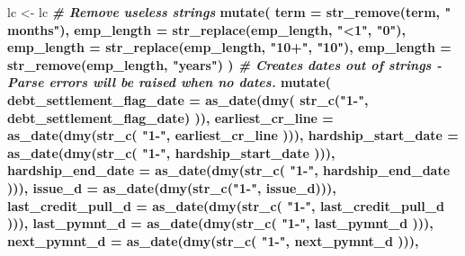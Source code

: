 \documentclass[11pt,]{report}
\newenvironment{Shaded}{\begin{snugshade}}{\end{snugshade}}
\newcommand{\CommentTok}[1]{\textcolor[rgb]{0.56,0.35,0.01}{\textit{#1}}}
\newcommand{\DataTypeTok}[1]{\textcolor[rgb]{0.13,0.29,0.53}{#1}}
\newcommand{\KeywordTok}[1]{\textcolor[rgb]{0.13,0.29,0.53}{\textbf{#1}}}
\newcommand{\NormalTok}[1]{#1}
\newcommand{\OperatorTok}[1]{\textcolor[rgb]{0.81,0.36,0.00}{\textbf{#1}}}
\newcommand{\StringTok}[1]{\textcolor[rgb]{0.31,0.60,0.02}{#1}}
\begin{document}
\begin{Shaded}
\begin{Highlighting}[numbers=left,,]
\NormalTok{  lc <-}\StringTok{ }\NormalTok{lc }\OperatorTok{%
\StringTok{    }\CommentTok{# Remove useless strings}
\StringTok{    }\KeywordTok{mutate}\NormalTok{(}
      \DataTypeTok{term       =} \KeywordTok{str_remove}\NormalTok{(term, }\StringTok{" months"}\NormalTok{),}
      \DataTypeTok{emp_length =} \KeywordTok{str_replace}\NormalTok{(emp_length, }\StringTok{"<1"}\NormalTok{, }\StringTok{"0"}\NormalTok{),}
      \DataTypeTok{emp_length =} \KeywordTok{str_replace}\NormalTok{(emp_length, }\StringTok{"10+"}\NormalTok{, }\StringTok{"10"}\NormalTok{),}
      \DataTypeTok{emp_length =} \KeywordTok{str_remove}\NormalTok{(emp_length, }\StringTok{"years"}\NormalTok{)}
\NormalTok{    ) }\OperatorTok{%
\StringTok{    }
\StringTok{    }\CommentTok{# Creates dates out of strings - Parse errors will be raised when no dates.}
\StringTok{    }\KeywordTok{mutate}\NormalTok{(}
      \DataTypeTok{debt_settlement_flag_date =} \KeywordTok{as_date}\NormalTok{(}\KeywordTok{dmy}\NormalTok{(}
        \KeywordTok{str_c}\NormalTok{(}\StringTok{"1-"}\NormalTok{, debt_settlement_flag_date)}
\NormalTok{      )),}
      \DataTypeTok{earliest_cr_line          =} \KeywordTok{as_date}\NormalTok{(}\KeywordTok{dmy}\NormalTok{(}\KeywordTok{str_c}\NormalTok{(}
        \StringTok{"1-"}\NormalTok{, earliest_cr_line}
\NormalTok{      ))),}
      \DataTypeTok{hardship_start_date       =} \KeywordTok{as_date}\NormalTok{(}\KeywordTok{dmy}\NormalTok{(}\KeywordTok{str_c}\NormalTok{(}
        \StringTok{"1-"}\NormalTok{, hardship_start_date}
\NormalTok{      ))),}
      \DataTypeTok{hardship_end_date         =} \KeywordTok{as_date}\NormalTok{(}\KeywordTok{dmy}\NormalTok{(}\KeywordTok{str_c}\NormalTok{(}
        \StringTok{"1-"}\NormalTok{, hardship_end_date}
\NormalTok{      ))),}
      \DataTypeTok{issue_d                   =} \KeywordTok{as_date}\NormalTok{(}\KeywordTok{dmy}\NormalTok{(}\KeywordTok{str_c}\NormalTok{(}\StringTok{"1-"}\NormalTok{, issue_d))),}
      \DataTypeTok{last_credit_pull_d        =} \KeywordTok{as_date}\NormalTok{(}\KeywordTok{dmy}\NormalTok{(}\KeywordTok{str_c}\NormalTok{(}
        \StringTok{"1-"}\NormalTok{, last_credit_pull_d}
\NormalTok{      ))),}
      \DataTypeTok{last_pymnt_d              =} \KeywordTok{as_date}\NormalTok{(}\KeywordTok{dmy}\NormalTok{(}\KeywordTok{str_c}\NormalTok{(}
        \StringTok{"1-"}\NormalTok{, last_pymnt_d}
\NormalTok{      ))),}
      \DataTypeTok{next_pymnt_d              =} \KeywordTok{as_date}\NormalTok{(}\KeywordTok{dmy}\NormalTok{(}\KeywordTok{str_c}\NormalTok{(}
        \StringTok{"1-"}\NormalTok{, next_pymnt_d}
\NormalTok{      ))),}
}}
\end{Highlighting}
\end{Shaded}
\end{document}
